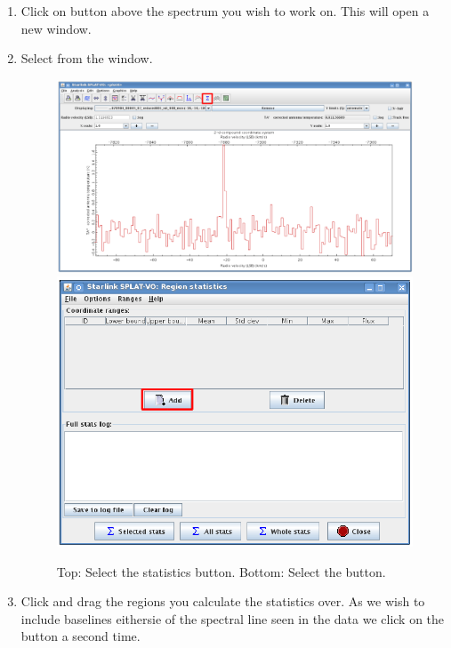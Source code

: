 \documentclass[11pt,oneside,chapters]{starlink}
\begin{document}
\begin{enumerate}[label=(\textbf{\arabic*})]

\item Click on 
button above the spectrum you wish to work on. This will open a
new window.


\item Select  from the  window.

\begin{figure}[h!]
\begin{center}
\includegraphics[width=0.75\linewidth]{sc20_splat_stats}
\includegraphics[width=0.6\linewidth]{sc20_splat_stats1}
\caption[Select the statistics button.]{\label{fig:splat_stats1}
  Top: Select the statistics button. Bottom: Select the 
  button.}
\end{center}
\end{figure}

\item Click and drag the regions you calculate the statistics over.
As we wish to include baselines eithersie of the spectral line seen
in the data we click on the  button a second time.


\end{enumerate}
\end{document}
